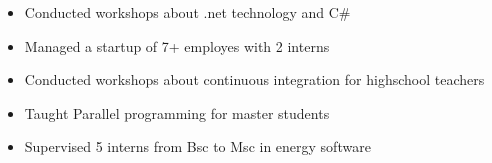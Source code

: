 \documentclass[10pt,a4paper,ragged2e,withhyper]{altacv}
\begin{document}
\begin{paracol}{2}










  \medskip

  \medskip
  \begin{itemize}
    \item Conducted workshops about .net technology and C\#
    \item Managed a startup of 7+ employes with 2 interns
    \item Conducted workshops about continuous integration for highschool teachers
    \item Taught Parallel programming for master students
    \item Supervised 5 interns from Bsc to Msc in energy software
  \end{itemize}

  \switchcolumn



  \medskip










\end{paracol}
\end{document}
